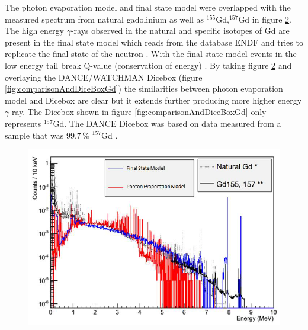 \begin{figure}[!h]
\begin{minipage}{.45\textwidth}
  \label{fig:conservationOfCascadeGd}
  \vspace{1.2654cm}%
\end{minipage}
\end{figure}

The photon evaporation model and final state model were overlapped with the measured spectrum from natural gadolinium as well as $^{155}$Gd,$^{157}$Gd in figure \ref{fig:comparisonGd}. The high energy $\gamma$-rays observed in the natural and specific isotopes of Gd are present in the final state model which reads from the database ENDF \cite{BROWN20181} and tries to replicate the final state of the neutron \cite{koiTatsumi_2006}. With the final state model events in the low energy tail break Q-value (conservation of energy) \cite{YuChen_2015}. By taking figure \ref{fig:comparisonGd} and overlaying the DANCE/WATCHMAN Dicebox (figure \ref{fig:comparisonAndDiceBoxGd}) the similarities between photon evaporation model and Dicebox are clear but it extends further producing more higher energy $\gamma$-ray. The Dicebox shown in figure \ref{fig:comparisonAndDiceBoxGd} only represents $^{157}$Gd. The DANCE Dicebox was based on data measured from a sample that was  99.7\,\% $^{157}$Gd \cite{Chyzh_2011}. 

\begin{figure}[!h]
 \centering
 \includegraphics[width=0.7\linewidth]{Chapter4/Figs/Raster/gadolinium/comparisonGd.png}
 \label{fig:comparisonGd}
\end{figure}

